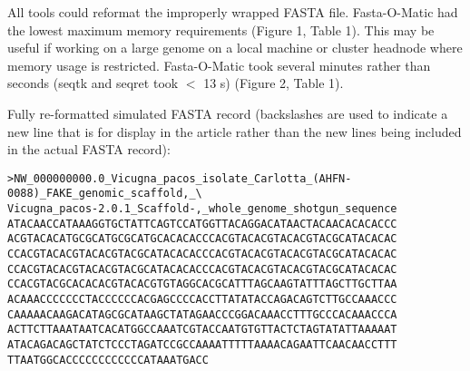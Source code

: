 All tools could reformat the improperly wrapped FASTA file. Fasta-O-Matic had the lowest maximum memory requirements (Figure 1, Table 1). This may be useful if working on a large genome on a local machine or cluster headnode where memory usage is restricted. Fasta-O-Matic took several minutes rather than seconds (seqtk and seqret took $<$ 13 s) (Figure 2, Table 1). 

Fully re-formatted simulated FASTA record (backslashes are used to indicate a new line that is for display in the article rather than the new lines being included in the actual FASTA record):
\begin{verbatim}
>NW_000000000.0_Vicugna_pacos_isolate_Carlotta_(AHFN-0088)_FAKE_genomic_scaffold,_\
Vicugna_pacos-2.0.1_Scaffold-,_whole_genome_shotgun_sequence
ATACAACCATAAAGGTGCTATTCAGTCCATGGTTACAGGACATAACTACAACACACACCC
ACGTACACATGCGCATGCGCATGCACACACCCACGTACACGTACACGTACGCATACACAC
CCACGTACACGTACACGTACGCATACACACCCACGTACACGTACACGTACGCATACACAC
CCACGTACACGTACACGTACGCATACACACCCACGTACACGTACACGTACGCATACACAC
CCACGTACGCACACACGTACACGTGTAGGCACGCATTTAGCAAGTATTTAGCTTGCTTAA
ACAAACCCCCCCTACCCCCCACGAGCCCCACCTTATATACCAGACAGTCTTGCCAAACCC
CAAAAACAAGACATAGCGCATAAGCTATAGAACCCGGACAAACCTTTGCCCACAAACCCA
ACTTCTTAAATAATCACATGGCCAAATCGTACCAATGTGTTACTCTAGTATATTAAAAAT
ATACAGACAGCTATCTCCCTAGATCCGCCAAAATTTTTAAAACAGAATTCAACAACCTTT
TTAATGGCACCCCCCCCCCCCATAAATGACC
\end{verbatim}
  
  
  
  
  
  
  
  
  
  
  
  
  
  